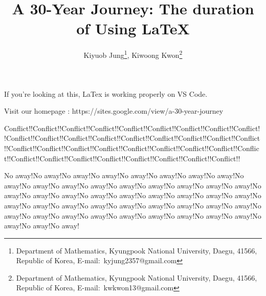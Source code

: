 \documentclass[a4paper,11pt]{article}
\title{
    A 30-Year Journey: The duration of Using LaTeX
    }
\author{
    Kiyuob Jung\thanks{Department of Mathematics, Kyungpook National University, Daegu, 41566, Republic of Korea, E-mail:~kyjung2357@gmail.com},
    Kiwoong Kwon\thanks{Department of Mathematics, Kyungpook National University, Daegu, 41566, Republic of Korea, E-mail:~kwkwon13@gmail.com}
    }
\begin{document}
\date{}
\maketitle

If you're looking at this, LaTex is working properly on VS Code.

Visit our homepage : https://sites.google.com/view/a-30-year-journey


Conflict!!Conflict!!Conflict!!Conflict!!Conflict!!Conflict!!Conflict!!Conflict!!Conflict!!Conflict!!Conflict!!Conflict!!Conflict!!Conflict!!Conflict!!Conflict!!Conflict!!Conflict!!Conflict!!Conflict!!Conflict!!Conflict!!Conflict!!Conflict!!Conflict!!Conflict!!Conflict!!Conflict!!Conflict!!Conflict!!Conflict!!Conflict!!Conflict!!Conflict!!Conflict!!

No away!No away!No away!No away!No away!No away!No away!No away!No away!No away!No away!No away!No away!No away!No away!No away!No away!No away!No away!No away!No away!No away!No away!No away!No away!No away!No away!No away!No away!No away!No away!No away!No away!No away!No away!No away!No away!No away!No away!No away!No away!No away!No away!No away!No away!No away!No away!
\end{document}
